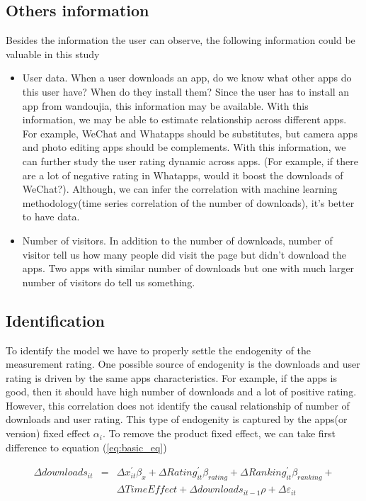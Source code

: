 \documentclass[11pt,twoside]{article}
\begin{document}
\subsection{Others information}
	Besides the information the user can observe, the following information could be valuable in this study
\begin{itemize}
	\item User data. When a user downloads an app, do we know what other apps do this user have? When do they install them? Since the user has to install an app from wandoujia, this information may be available. With this information, we may be able to estimate relationship across different apps. For example, WeChat and Whatapps should be substitutes, but camera apps and photo editing apps should be complements. With this information, we can further study the user rating dynamic across apps. (For example, if there are a lot of negative rating in Whatapps, would it boost the downloads of WeChat?). Although, we can infer the correlation with machine learning methodology(time series correlation of the number of downloads), it's better to have data.   
	\item Number of visitors. In addition to the number of downloads, number of visitor tell us how many people did visit the page but didn't download the apps. Two apps with similar number of downloads but one with much larger number of visitors do tell us something. 
\end{itemize} 

\subsection{Identification}
	To identify the model we have to properly settle the endogenity of the measurement rating. One possible source of endogenity is the downloads and user rating is driven by the same apps characteristics. For example, if the apps is good, then it should have high number of downloads and a lot of positive rating. However, this correlation does not identify the  causal relationship of number of downloads and user rating. This type of endogenity is captured by the apps(or version) fixed effect $\alpha_i$. To remove the product fixed effect, we can take first difference to equation (\ref{eq:basic_eq})
	
\begin{eqnarray} \label{eq:diff_equation}
	\Delta downloads_{it} &=& \Delta x_{it}^{'} \beta_{x} + \Delta Rating_{it}^{'} \beta_{rating} + \Delta Ranking_{it}^{'} \beta_{ranking} + \\
	&& \Delta TimeEffect +  \Delta downloads_{it-1} \rho + \Delta \varepsilon_{it}
\end{eqnarray}
	
\end{document}

